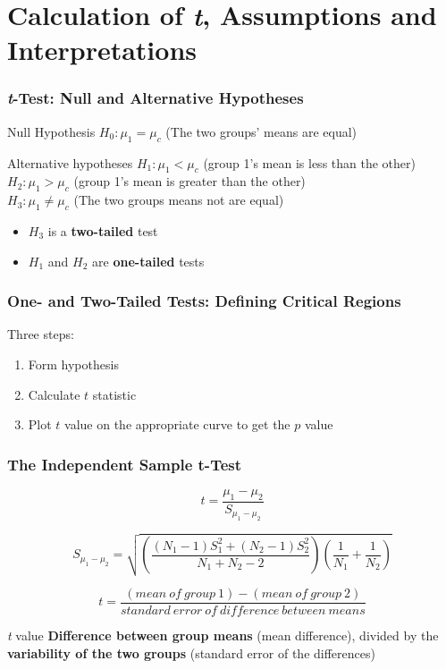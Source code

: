 \documentclass[12pt, block=fill]{beamer}
\begin{document}



\section{Calculation of \textit{t}, Assumptions and Interpretations}

\begin{frame}
  \frametitle{\textit{t}-Test: Null and Alternative Hypotheses}

  \begin{exampleblock}{Null Hypothesis}
    $H_{0}: \mu_{1} = \mu_{c}$ (The two groups' means are equal)
  \end{exampleblock}
  
  \begin{exampleblock}{Alternative hypotheses}
    $H_{1}: \mu_{1} < \mu_{c}$ (group 1's mean is less than the other) \\
    $H_{2}: \mu_{1} > \mu_{c}$ (group 1's mean is greater than the other) \\
    $H_{3}: \mu_{1} \neq \mu_{c}$ (The two groups means not are equal)
  \end{exampleblock}
  \begin{itemize}
      \item $H_{3}$ is a \textbf{two-tailed} test
      \item $H_{1}$ and $H_{2}$ are \textbf{one-tailed} tests
  \end{itemize}
\end{frame}

\begin{frame}
  \frametitle{One- and Two-Tailed Tests: Defining Critical Regions}
  
  Three steps:
  \begin{enumerate}
      \item Form hypothesis
      \item Calculate $t$ statistic
      \item Plot $t$ value on the appropriate curve to get the $p$ value
  \end{enumerate}
\end{frame}

\begin{frame}
  \frametitle{The Independent Sample t-Test}

  $$t = \frac{\mu_{1}-\mu_{2}}{S_{\mu_{1}-\mu_{2}}} $$

  $$
    S_{\mu_{1}-\mu_{2}} = \sqrt{ \left(\frac{ (N_{1}-1)S_{1}^{2} + (N_{2}-1)S_{2}^{2} }{ N_{1}+N_{2}-2 }\right)
                    \left(\frac{1}{ N_{1} } + \frac{1}{ N_{2} }\right)
                  }
  $$

  $$
    t = \frac{(mean\ of\ group\ 1) - (mean\ of\ group\ 2)}{standard\ error\ of\ difference\ between\ means}
  $$
  
  
  \begin{exampleblock}{\textit{t} value}
    \textbf{Difference between group means} (mean difference), divided by the \textbf{variability of the two groups} (standard error of the differences)
  \end{exampleblock}

\end{frame}
\end{document}

